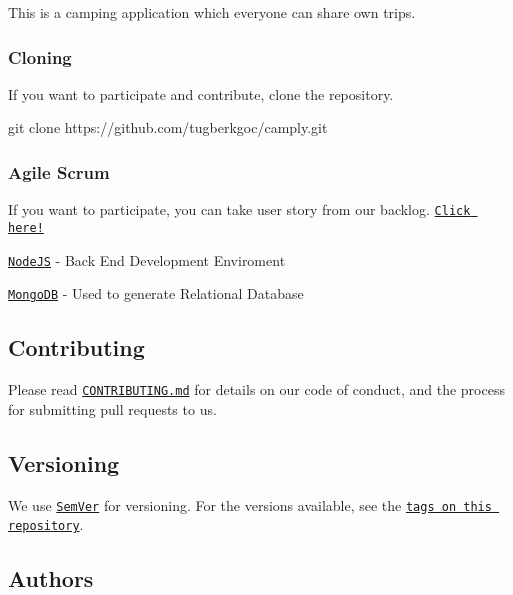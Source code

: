 \href{https://github.com/tugberkgoc/hacker-rank-tutorials/releases}{\tt }

This is a camping application which everyone can share own trips.

\subsubsection*{Cloning}

If you want to participate and contribute, clone the repository.


\begin{DoxyCode}
git clone https://github.com/tugberkgoc/camply.git
\end{DoxyCode}


\subsubsection*{Agile Scrum}

If you want to participate, you can take user story from our backlog. \href{https://trello.com/b/XNGXBxr1/camply}{\tt Click here!}


\begin{DoxyItemize}
\item \href{https://nodejs.org/en/about/}{\tt Node\+JS} -\/ Back End Development Enviroment
\item \href{https://www.mongodb.com/}{\tt Mongo\+DB} -\/ Used to generate Relational Database
\end{DoxyItemize}

\subsection*{Contributing}

Please read \href{https://gist.github.com/PurpleBooth/b24679402957c63ec426}{\tt C\+O\+N\+T\+R\+I\+B\+U\+T\+I\+N\+G.\+md} for details on our code of conduct, and the process for submitting pull requests to us.

\subsection*{Versioning}

We use \href{http://semver.org/}{\tt Sem\+Ver} for versioning. For the versions available, see the \href{https://github.com/your/project/tags}{\tt tags on this repository}.

\subsection*{Authors}


